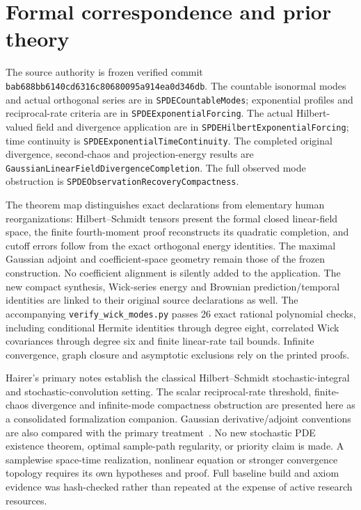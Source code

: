 \documentclass[11pt]{article}
\newcommand{\code}[1]{{\small\nolinkurl{#1}}}
\begin{document}
\section{Formal correspondence and prior theory}
\begingroup\raggedright
The source authority is frozen verified commit
\code{bab688bb6140cd6316c80680095a914ea0d346db}.
The countable isonormal modes and actual orthogonal series are in
\code{SPDECountableModes}; exponential profiles and reciprocal-rate
criteria are in \code{SPDEExponentialForcing}. The actual Hilbert-valued
field and divergence application are in
\code{SPDEHilbertExponentialForcing}; time continuity is
\code{SPDEExponentialTimeContinuity}. The completed original
divergence, second-chaos and projection-energy results are
\code{GaussianLinearFieldDivergenceCompletion}. The full observed
mode obstruction is \code{SPDEObservationRecoveryCompactness}.

The theorem map distinguishes exact declarations from elementary human
reorganizations: Hilbert--Schmidt tensors present the formal closed
linear-field space, the finite fourth-moment proof reconstructs its
quadratic completion, and cutoff errors follow from the exact
orthogonal energy identities. The maximal Gaussian adjoint and
coefficient-space geometry remain those of the frozen construction.
No coefficient alignment is silently added to the application. The new
compact synthesis, Wick-series energy and Brownian prediction/temporal
identities are linked to their original source declarations as well.
The accompanying \code{verify_wick_modes.py} passes 26 exact rational
polynomial checks, including conditional Hermite identities through
degree eight, correlated Wick covariances through degree six and finite
linear-rate tail bounds. Infinite convergence, graph closure and
asymptotic exclusions rely on the printed proofs.

Hairer's primary notes establish the classical Hilbert--Schmidt
stochastic-integral and stochastic-convolution setting. The scalar
reciprocal-rate threshold, finite-chaos divergence and infinite-mode
compactness obstruction are presented here as a consolidated
formalization companion. Gaussian derivative/adjoint conventions are
also compared with the primary treatment~\cite{SV}. No new stochastic
PDE existence theorem, optimal sample-path regularity, or priority
claim is made. A samplewise space-time realization, nonlinear equation
or stronger convergence topology requires its own hypotheses and
proof. Full baseline build and axiom evidence was hash-checked rather
than repeated at the expense of active research resources.
\par\endgroup
\end{document}
